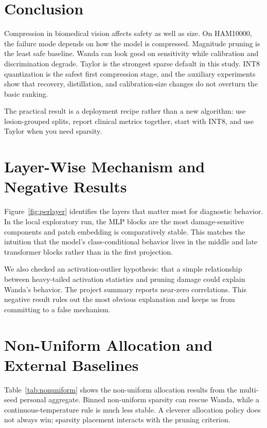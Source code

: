 \documentclass{article}
\begin{document}
\section{Conclusion}
Compression in biomedical vision affects safety as well as size. On HAM10000, the failure mode depends on how the model is compressed. Magnitude pruning is the least safe baseline. Wanda can look good on sensitivity while calibration and discrimination degrade. Taylor is the strongest sparse default in this study. INT8 quantization is the safest first compression stage, and the auxiliary experiments show that recovery, distillation, and calibration-size changes do not overturn the basic ranking.

The practical result is a deployment recipe rather than a new algorithm: use lesion-grouped splits, report clinical metrics together, start with INT8, and use Taylor when you need sparsity.

\appendix
\section{Layer-Wise Mechanism and Negative Results}
Figure~\ref{fig:perlayer} identifies the layers that matter most for diagnostic behavior. In the local exploratory run, the MLP blocks are the most damage-sensitive components and patch embedding is comparatively stable. This matches the intuition that the model's class-conditional behavior lives in the middle and late transformer blocks rather than in the first projection.

We also checked an activation-outlier hypothesis: that a simple relationship between heavy-tailed activation statistics and pruning damage could explain Wanda's behavior. The project summary reports near-zero correlations. This negative result rules out the most obvious explanation and keeps us from committing to a false mechanism.

\section{Non-Uniform Allocation and External Baselines}
Table~\ref{tab:nonuniform} shows the non-uniform allocation results from the multi-seed personal aggregate. Binned non-uniform sparsity can rescue Wanda, while a continuous-temperature rule is much less stable. A cleverer allocation policy does not always win; sparsity placement interacts with the pruning criterion.
\end{document}
